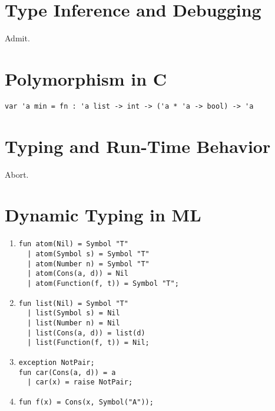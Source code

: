 \section{Type Inference and Debugging}
Admit.


\section{ Polymorphism in C}
\begin{verbatim}
var 'a min = fn : 'a list -> int -> ('a * 'a -> bool) -> 'a
\end{verbatim}


\section{Typing and Run-Time Behavior}
Abort.


\section{Dynamic Typing in ML}

\begin{enumerate}
  \item 
\begin{verbatim}
fun atom(Nil) = Symbol "T"
  | atom(Symbol s) = Symbol "T"
  | atom(Number n) = Symbol "T"
  | atom(Cons(a, d)) = Nil
  | atom(Function(f, t)) = Symbol "T";
\end{verbatim}
  
  \item
\begin{verbatim}
fun list(Nil) = Symbol "T"
  | list(Symbol s) = Nil
  | list(Number n) = Nil
  | list(Cons(a, d)) = list(d)
  | list(Function(f, t)) = Nil;
\end{verbatim}
  
  \item 
\begin{verbatim}
exception NotPair;
fun car(Cons(a, d)) = a
  | car(x) = raise NotPair;
\end{verbatim}
  
  \item
\begin{verbatim}
fun f(x) = Cons(x, Symbol("A"));
\end{verbatim}
\end{enumerate}


